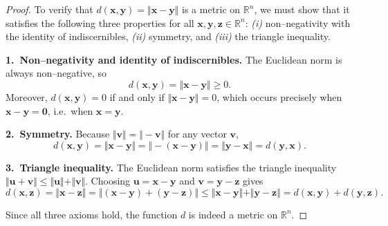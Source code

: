 \documentclass[10pt]{extarticle}
\begin{document}
\begin{proof}
    To verify that $d(\mathbf{x}, \mathbf{y}) = \Vert \mathbf{x} - \mathbf{y} \Vert$ is a metric on $\mathbb{R}^n$, we must show that it satisfies the following three properties for all $\mathbf{x}, \mathbf{y}, \mathbf{z} \in \mathbb{R}^n$:
    \emph{(i)} non--negativity with the identity of indiscernibles, \emph{(ii)} symmetry, and \emph{(iii)} the triangle inequality.

    \medskip
    \textbf{1.~Non--negativity and identity of indiscernibles.} The Euclidean norm is always non--negative, so
    $$
        d(\mathbf{x}, \mathbf{y}) = \Vert \mathbf{x} - \mathbf{y} \Vert \ge 0.
    $$
    Moreover, $d(\mathbf{x}, \mathbf{y}) = 0$ if and only if $\Vert \mathbf{x} - \mathbf{y} \Vert = 0$, which occurs precisely when $\mathbf{x} - \mathbf{y} = \mathbf{0}$, i.e.~when $\mathbf{x} = \mathbf{y}$.

    \medskip
    \textbf{2.~Symmetry.} Because $\Vert \mathbf{v} \Vert = \Vert -\mathbf{v} \Vert$ for any vector $\mathbf{v}$,
    $$
        d(\mathbf{x}, \mathbf{y}) = \Vert \mathbf{x} - \mathbf{y} \Vert = \Vert -(\mathbf{x} - \mathbf{y}) \Vert = \Vert \mathbf{y} - \mathbf{x} \Vert = d(\mathbf{y}, \mathbf{x}).
    $$

    \medskip
    \textbf{3.~Triangle inequality.} The Euclidean norm satisfies the triangle inequality $\Vert \mathbf{u} + \mathbf{v} \Vert \le \Vert \mathbf{u} \Vert + \Vert \mathbf{v} \Vert$. Choosing $\mathbf{u} = \mathbf{x} - \mathbf{y}$ and $\mathbf{v} = \mathbf{y} - \mathbf{z}$ gives
    $$
        d(\mathbf{x}, \mathbf{z}) = \Vert \mathbf{x} - \mathbf{z} \Vert = \Vert (\mathbf{x} - \mathbf{y}) + (\mathbf{y} - \mathbf{z}) \Vert \le \Vert \mathbf{x} - \mathbf{y} \Vert + \Vert \mathbf{y} - \mathbf{z} \Vert = d(\mathbf{x}, \mathbf{y}) + d(\mathbf{y}, \mathbf{z}).
    $$

    Since all three axioms hold, the function $d$ is indeed a metric on $\mathbb{R}^n$.
\end{proof}
\end{document}

